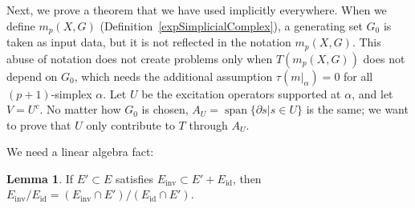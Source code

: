 \documentclass[reprint, amsmath, amssymb, showpacs, floatfix, longbibliography, aps, twocolumn, superscriptaddress, nofootinbib]{revtex4-2}
\theoremstyle{definition}
\newtheorem{lemma}{Lemma}[section]
\begin{document}
Next, we prove a theorem that we have used implicitly everywhere. When we define $m_p(X,G)$ (Definition~\ref{expSimplicialComplex}), a generating set $G_0$ is taken as input data, but it is not reflected in the notation $m_p(X,G)$. This abuse of notation does not create problems only when $T(m_p(X,G))$ does not depend on $G_0$, which needs the additional assumption $\tau(m|_\alpha)=0$ for all $(p+1)$-simplex $\alpha$. Let $U$ be the excitation operators supported at $\alpha$, and let $V=U^c$. No matter how $G_0$ is chosen, $A_U=\operatorname{span}\{\partial s|s\in U\}$ is the same; we want to prove that $U$ only contribute to $T$ through $A_U$.

We need a linear algebra fact:
\begin{lemma}\label{lemmaLatticeIsomorphic}
	If $E'\subset E$ satisfies $E_{\operatorname{inv}}\subset E'+E_{\operatorname{id}}$, then $E_{\operatorname{inv}}/E_{\operatorname{id}}=(E_{\operatorname{inv}}\cap E')/(E_{\operatorname{id}}\cap E')$.
\end{lemma}
\end{document}
